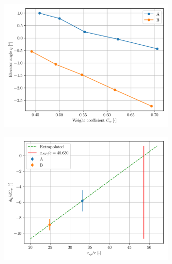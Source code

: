 \documentclass{article}
\begin{document}
\begin{figure}[H]
    \centering
    \includegraphics[width=0.8\textwidth]{Longitudinal_Static_Stability_1.png}
    \caption{}
    \label{fig:Longitudinal_Static_Stability_1}
\end{figure}
\begin{figure}[H]
    \centering
    \includegraphics[width=0.8\textwidth]{Longitudinal_Static_Stability_2.png}
    \caption{}
    \label{fig:Longitudinal_Static_Stability_2}
\end{figure}
\end{document}
